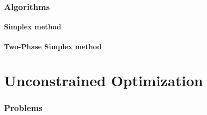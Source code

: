\documentclass[a4paper]{article}
\newcommand{\labbase}{}
\let\OrigLstInputListing
\renewcommand{}[2][]{\OrigLstInputListing[#1]{\labbase#2}}
\begin{document}
\section{Algorithms}
\subsection{Simplex method}%
\label{alg:simplex}


\subsection{Two-Phase Simplex method}%
\label{alg:two-phase-simplex}


\part{Unconstrained Optimization}

\renewcommand{\labbase}{lab7/}

\section{Problems}




\clearpage

\nocite{Zdunek, GoluVanl96, Meyer, Zarowski, Demmel, Gerschgorin, Bjorck, GorodRao97}


\end{document}
